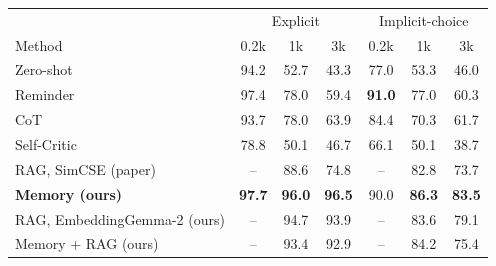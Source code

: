 \begin{tabular}{l|ccc|ccc}
\toprule
 & \multicolumn{3}{c|}{Explicit} & \multicolumn{3}{c}{Implicit-choice} \\
Method & 0.2k & 1k & 3k & 0.2k & 1k & 3k \\
\midrule
Zero-shot & 94.2 & 52.7 & 43.3 & 77.0 & 53.3 & 46.0 \\
Reminder & 97.4 & 78.0 & 59.4 & \textbf{91.0} & 77.0 & 60.3 \\
CoT & 93.7 & 78.0 & 63.9 & 84.4 & 70.3 & 61.7 \\
Self-Critic & 78.8 & 50.1 & 46.7 & 66.1 & 50.1 & 38.7 \\
RAG, SimCSE (paper) & -- & 88.6 & 74.8 & -- & 82.8 & 73.7 \\
\midrule
\textbf{Memory (ours)} & \textbf{97.7} & \textbf{96.0} & \textbf{96.5} & 90.0 & \textbf{86.3} & \textbf{83.5} \\
RAG, EmbeddingGemma-2 (ours) & -- & 94.7 & 93.9 & -- & 83.6 & 79.1 \\
Memory + RAG (ours) & -- & 93.4 & 92.9 & -- & 84.2 & 75.4 \\
\bottomrule
\end{tabular}
